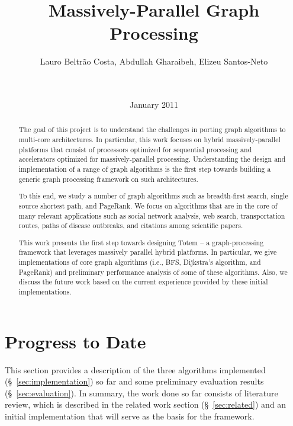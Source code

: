 \documentclass{acm_proc_article-sp}[12pt]
\title{Massively-Parallel Graph Processing}
\author{
\alignauthor 
Lauro Beltr\~ao Costa, Abdullah Gharaibeh, Elizeu
Santos-Neto\vspace{3mm}\\
       \affaddr{\small{University of British Columbia}}\\
       \affaddr{\small{2332 Main Mall, Vancouver, BC, CANADA}}\\
       \email{\small{\{lauroc,abdullah,elizeus\}@ece.ubc.ca}}
}
\date{ January 2011}
\newcommand{\comment}[2]{\begin{center}\colorbox{#1}{\parbox{0.85\linewidth}{\textit{{#2}}}}\end{center}}
\newcommand{\abdullah}[1]{\comment{midblue}{{Abdullah: #1}}}
\newcommand{\lauro}[1]{\comment{orange}{{Lauro: #1}}}
\newcommand{\elizeu}[1]{\comment{lightgreen}{{Elizeu: #1}}}
\begin{document}
\maketitle


\begin{abstract}
The goal of this project is to understand the challenges in porting graph algorithms to multi-core architectures. In particular, this work focuses on hybrid massively-parallel platforms that consist of processors optimized for sequential processing and accelerators optimized for massively-parallel processing. Understanding the design and implementation of a range of graph algorithms is the first step towards building a generic graph processing framework on such architectures.

To this end, we study a number of graph algorithms such as breadth-first search, single source shortest path, and PageRank. We focus on algorithms that are in the core of many relevant applications such as social network analysis, web search, transportation routes, paths of disease outbreaks, and citations among scientific papers.

This work presents the first step towards designing {\sc Totem} -- a graph-processing framework that leverages massively parallel hybrid platforms. In particular, we give implementations of core graph algorithms (i.e., BFS, Dijkstra's algorithm, and PageRank) and preliminary performance analysis of some of these algorithms. Also, we discuss the future work based on the current experience provided by these initial implementations.


\end{abstract}







\section{Progress to Date}
\label{sec:progress}

This section provides a description of the three algorithms implemented (\S~\ref{sec:implementation}) so far and some preliminary evaluation results (\S~\ref{sec:evaluation}). In summary, the work done so far consists of literature review, which is described in the related work section (\S~\ref{sec:related}) and an initial implementation that will serve as the basis for the framework.


%






\end{document}
